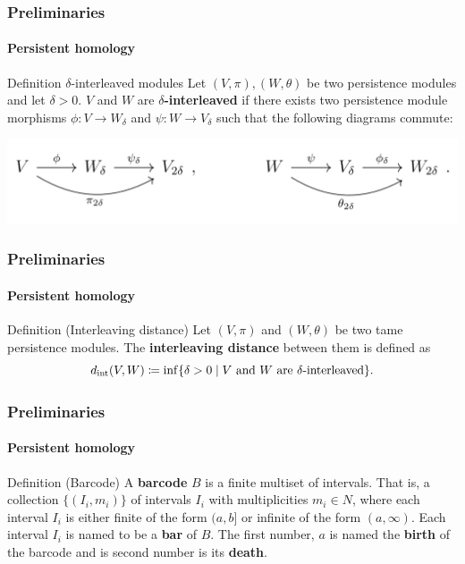 \documentclass[aspectratio=169]{beamer}
\begin{document}
\begin{frame}
  \frametitle{Preliminaries}
  \framesubtitle{Persistent homology}

  \begin{block}{Definition $\delta$-interleaved modules}
    Let $ (V, \pi), (W, \theta) $ be two persistence modules and let $ \delta > 0 $. $ V $ and $ W $ are {\bf $\delta$-interleaved } if there exists two persistence module morphisms $ \phi \colon V \to W_\delta $ and $ \psi \colon W \to V_\delta $ such that the following diagrams commute:
  \end{block}


  \centering
  \includegraphics[width=0.8\linewidth]{../figures/diagrams.png}

\end{frame}

\begin{frame}
  \frametitle{Preliminaries}
  \framesubtitle{Persistent homology}
  \begin{block}{Definition (Interleaving distance)}
    Let $ (V, \pi) $ and $ (W, \theta) $ be two tame persistence modules. The {\bf interleaving distance} between them is defined as
    \begin{equation}
        d_{\operatorname{int}}(V, W) \coloneq \inf \{ \delta > 0 \mid V \text{ and } W \text{ are } \delta\text{-interleaved}\}.
    \end{equation}
  \end{block}
\end{frame}

\begin{frame}
  \frametitle{Preliminaries}
  \framesubtitle{Persistent homology}
  \begin{block}{Definition (Barcode)}
        A {\bf barcode} $B$ is a finite multiset of intervals. That is, a collection $\{(I_i, m_i)\}$ of intervals $I_i$ with multiplicities $m_i \in N$, where each interval $ I_i $ is either finite of the form $(a, b]$ or infinite of the form $(a, \infty)$. Each interval $I_i$ is named to be a {\bf bar} of $B$. The first number, $ a $ is named the {\bf birth} of the barcode and is second number is its {\bf death}.
  \end{block}
\end{frame}
\end{document}
